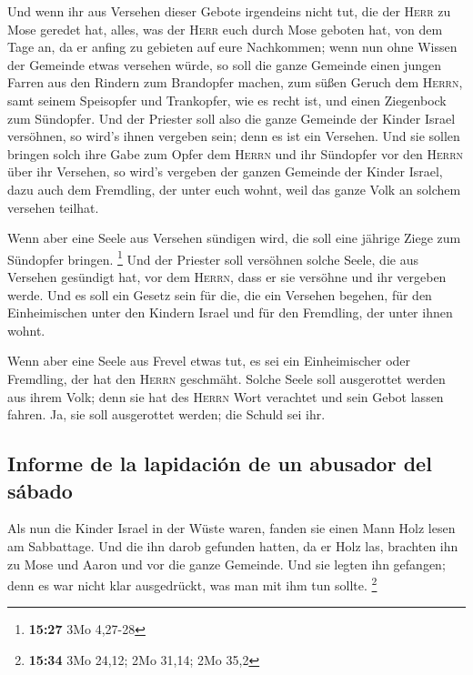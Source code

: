  Und wenn ihr aus Versehen dieser Gebote irgendeins nicht
tut, die der \textsc{Herr} zu Mose geredet hat,  alles,
was der \textsc{Herr} euch durch Mose geboten hat, von dem Tage an, da
er anfing zu gebieten auf eure Nachkommen;  wenn nun ohne
Wissen der Gemeinde etwas versehen würde, so soll die ganze Gemeinde
einen jungen Farren aus den Rindern zum Brandopfer machen, zum süßen
Geruch dem \textsc{Herrn}, samt seinem Speisopfer und Trankopfer, wie es
recht ist, und einen Ziegenbock zum Sündopfer.  Und der
Priester soll also die ganze Gemeinde der Kinder Israel versöhnen, so
wird's ihnen vergeben sein; denn es ist ein Versehen. Und sie sollen
bringen solch ihre Gabe zum Opfer dem \textsc{Herrn} und ihr Sündopfer
vor den \textsc{Herrn} über ihr Versehen,  so wird's
vergeben der ganzen Gemeinde der Kinder Israel, dazu auch dem Fremdling,
der unter euch wohnt, weil das ganze Volk an solchem versehen teilhat.

 Wenn aber eine Seele aus Versehen sündigen wird, die
soll eine jährige Ziege zum Sündopfer bringen. \footnote{\textbf{15:27}
  3Mo 4,27-28}  Und der Priester soll versöhnen solche
Seele, die aus Versehen gesündigt hat, vor dem \textsc{Herrn}, dass er
sie versöhne und ihr vergeben werde.  Und es soll ein
Gesetz sein für die, die ein Versehen begehen, für den Einheimischen
unter den Kindern Israel und für den Fremdling, der unter ihnen wohnt.

 Wenn aber eine Seele aus Frevel etwas tut, es sei ein
Einheimischer oder Fremdling, der hat den \textsc{Herrn} geschmäht.
Solche Seele soll ausgerottet werden aus ihrem Volk; 
denn sie hat des \textsc{Herrn} Wort verachtet und sein Gebot lassen
fahren. Ja, sie soll ausgerottet werden; die Schuld sei ihr.

\hypertarget{informe-de-la-lapidaciuxf3n-de-un-abusador-del-suxe1bado}{%
\subsection{Informe de la lapidación de un abusador del
sábado}\label{informe-de-la-lapidaciuxf3n-de-un-abusador-del-suxe1bado}}

 Als nun die Kinder Israel in der Wüste waren, fanden sie
einen Mann Holz lesen am Sabbattage.  Und die ihn darob
gefunden hatten, da er Holz las, brachten ihn zu Mose und Aaron und vor
die ganze Gemeinde.  Und sie legten ihn gefangen; denn es
war nicht klar ausgedrückt, was man mit ihm tun sollte. \footnote{\textbf{15:34}
  3Mo 24,12; 2Mo 31,14; 2Mo 35,2}

